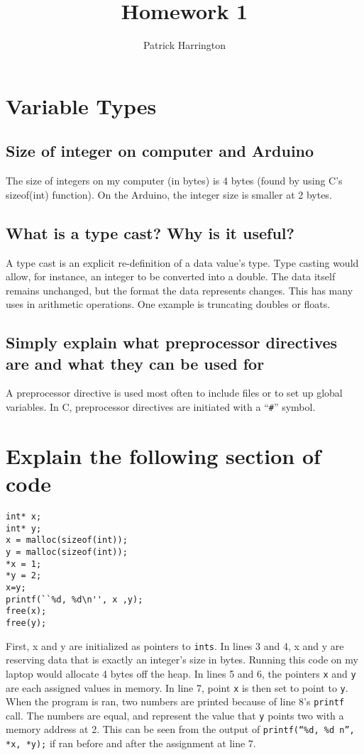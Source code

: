 \documentclass{hw}
\title{Homework 1}
\author{Patrick Harrington}
\begin{document}
\maketitle
\section{Variable Types}
\subsection{Size of integer on computer and Arduino}
The size of integers on my computer (in bytes) is 4 bytes (found by using C's
sizeof(int) function). On the Arduino, the integer size is smaller at 2 bytes.
\subsection{What is a type cast? Why is it useful?}
A type cast is an explicit re-definition of a data value's type. Type casting
would allow, for instance, an integer to be converted into a double. The data
itself remains unchanged, but the format the data represents changes. This has
many uses in arithmetic operations. One example is truncating doubles or
floats.
\subsection{Simply explain what preprocessor directives are and what they can
be used for}
A preprocessor directive is used most often to include files or to set up
global variables. In C, preprocessor directives are initiated with a
``\texttt{\#}''
symbol.
\section{Explain the following section of code}
\begin{lstlisting}
int* x;
int* y;
x = malloc(sizeof(int));
y = malloc(sizeof(int));
*x = 1;
*y = 2;
x=y;
printf(``%d, %d\n'', x ,y);
free(x);
free(y);
\end{lstlisting}

First, x and y are initialized as pointers to \texttt{ints}. In lines 3 and 4,
x and y are reserving data that is exactly an integer's size in bytes. Running
this code on my laptop would allocate 4 bytes off the heap. In lines 5 and 6,
the pointers \texttt{x} and \texttt{y} are each assigned values in memory. In
line 7, point \texttt{x} is then set to point to \texttt{y}. When the program
is ran, two numbers are printed because of line 8's \texttt{printf} call. The
numbers are equal, and represent the value that \texttt{y} points two
with a memory address at 2. This can be seen from the output of
\texttt{printf(``\%d, \%d\\n'', *x, *y);} if ran before and after the
assignment at line 7.
\end{document}
